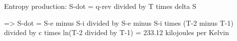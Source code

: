 Entropy production:  
S-dot = q-rev divided by T times delta S  

=> S-dot = S-e minus S-i divided by S-e minus S-i times (T-2 minus T-1) divided by c times ln(T-2 divided by T-1)  
= 233.12 kilojoules per Kelvin
